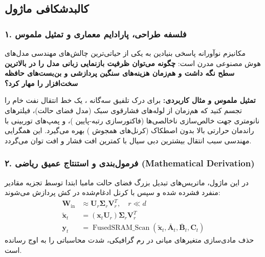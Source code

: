 \subsection{کالبدشکافی ماژول }

\subsubsection*{۱. فلسفه طراحی، پارادایم معماری و تمثیل ملموس}
مکانیزم نوآورانه  پاسخی بنیادین به یکی از حیاتی‌ترین چالش‌های مهندسی مدل‌های هوش مصنوعی مدرن است: \textbf{چگونه می‌توان ظرفیت بازنمایی زبانی مدل را در بالاترین سطح نگه داشت و هم‌زمان هزینه‌های سنگین پردازشی و بن‌بست‌های حافظه سخت‌افزار را مهار کرد؟}

\textbf{تمثیل ملموس و مثال کاربردی:}
برای درک تلفیق سه‌گانه ، یک خط انتقال نفت خام را تجسم کنید که هم‌زمان از لوله‌های فشارقوی سبک (مدل فضای حالت)، فیلترهای نانومتری جهت خالص‌سازی ناخالصی‌ها (فاکتورسازی رتبه-پایین )، و پمپ‌های توربینی با راندمان حرارتی بالا بدون اصطکاک (کرنل‌های همجوش ) بهره می‌گیرد. این همگرایی مهندسی سبب انتقال بیشترین دبی سیال با کمترین افت فشار و افت توان می‌گردد.

\subsubsection*{۲. فرمول‌بندی و استنتاج عمیق ریاضی (Mathematical Derivation)}
در این ماژول، ماتریس‌های تبدیل بزرگ فضای حالت مامبا ابتدا توسط تجزیه مقادیر منفرد فشرده شده و سپس با کرنل ادغام‌شده در کش پردازش می‌شوند:
\begin{align}
\mathbf{W}_{\text{in}} &\approx \mathbf{U}_r \mathbf{\Sigma}_r \mathbf{V}_r^T, \quad r \ll d \\
\tilde{\mathbf{x}}_t &= (\mathbf{x}_t \mathbf{U}_r) \mathbf{\Sigma}_r \mathbf{V}_r^T \\
\mathbf{y}_t &= \operatorname{FusedSRAM\_Scan}(\tilde{\mathbf{x}}_t, \bar{\mathbf{A}}_t, \bar{\mathbf{B}}_t, \mathbf{C}_t)
\end{align}
حذف مادی‌سازی متغیرهای میانی در رم گرافیکی، شدت محاسباتی را به اوج رسانده است.


